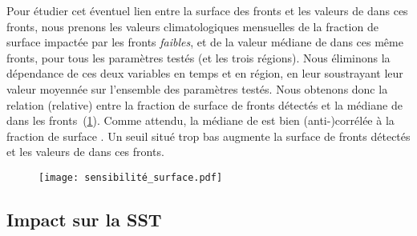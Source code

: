 Pour étudier cet éventuel lien entre la surface des fronts et les valeurs de  dans ces fronts, nous prenons les valeurs climatologiques mensuelles de la fraction de surface impactée par les fronts \emph{faibles}, et de la valeur médiane de  dans ces même fronts, pour tous les paramètres testés (et les trois régions).
Nous éliminons la dépendance de ces deux variables en temps et en région, en leur soustrayant leur valeur moyennée sur l'ensemble des paramètres testés.
Nous obtenons donc la relation (relative) entre la fraction de surface de fronts détectés et la médiane de  dans les fronts~(\cref{fig:sensibilite-surface}).
Comme attendu, la médiane de  est bien (anti-)corrélée à la fraction de surface .
Un seuil situé trop bas augmente la surface de fronts détectés et  les valeurs de  dans ces fronts.

\begin{figure}
  \centering
  \texttt{[image: sensibilité\_surface.pdf]}
  \label{fig:sensibilite-surface}
\end{figure}


\subsection{Impact sur la SST}
